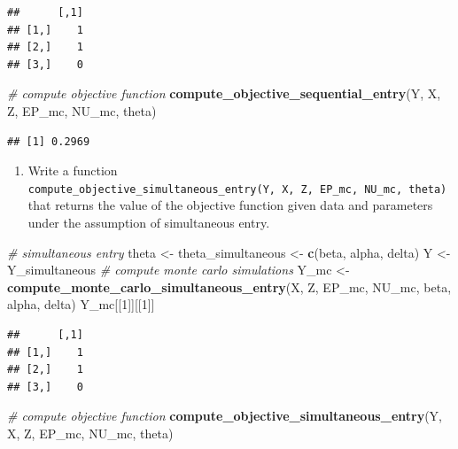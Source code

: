 \documentclass[]{book}
\newenvironment{Shaded}{\begin{snugshade}}{\end{snugshade}}
\newcommand{\KeywordTok}[1]{\textcolor[rgb]{0.13,0.29,0.53}{\textbf{#1}}}
\newcommand{\DecValTok}[1]{\textcolor[rgb]{0.00,0.00,0.81}{#1}}
\newcommand{\StringTok}[1]{\textcolor[rgb]{0.31,0.60,0.02}{#1}}
\newcommand{\CommentTok}[1]{\textcolor[rgb]{0.56,0.35,0.01}{\textit{#1}}}
\newcommand{\NormalTok}[1]{#1}
\providecommand{\tightlist}{%
  \setlength{\itemsep}{0pt}\setlength{\parskip}{0pt}}
\begin{document}
\begin{verbatim}
##      [,1]
## [1,]    1
## [2,]    1
## [3,]    0
\end{verbatim}

\begin{Shaded}
\begin{Highlighting}[]
\CommentTok{# compute objective function}
\KeywordTok{compute_objective_sequential_entry}\NormalTok{(Y, X, Z, EP_mc, NU_mc, theta)}
\end{Highlighting}
\end{Shaded}

\begin{verbatim}
## [1] 0.2969
\end{verbatim}

\begin{enumerate}
\def\labelenumi{\arabic{enumi}.}
\setcounter{enumi}{2}
\tightlist
\item
  Write a function
  \texttt{compute\_objective\_simultaneous\_entry(Y,\ X,\ Z,\ EP\_mc,\ NU\_mc,\ theta)}
  that returns the value of the objective function given data and
  parameters under the assumption of simultaneous entry.
\end{enumerate}

\begin{Shaded}
\begin{Highlighting}[]
\CommentTok{# simultaneous entry}
\NormalTok{theta <-}\StringTok{ }\NormalTok{theta_simultaneous <-}
\StringTok{  }\KeywordTok{c}\NormalTok{(beta, alpha, delta)}
\NormalTok{Y <-}\StringTok{ }\NormalTok{Y_simultaneous}
\CommentTok{# compute monte carlo simulations}
\NormalTok{Y_mc <-}\StringTok{ }\KeywordTok{compute_monte_carlo_simultaneous_entry}\NormalTok{(X, Z, EP_mc, NU_mc, beta, alpha, delta)}
\NormalTok{Y_mc[[}\DecValTok{1}\NormalTok{]][[}\DecValTok{1}\NormalTok{]]}
\end{Highlighting}
\end{Shaded}

\begin{verbatim}
##      [,1]
## [1,]    1
## [2,]    1
## [3,]    0
\end{verbatim}

\begin{Shaded}
\begin{Highlighting}[]
\CommentTok{# compute objective function}
\KeywordTok{compute_objective_simultaneous_entry}\NormalTok{(Y, X, Z, EP_mc, NU_mc, theta)}
\end{Highlighting}
\end{Shaded}
\end{document}
